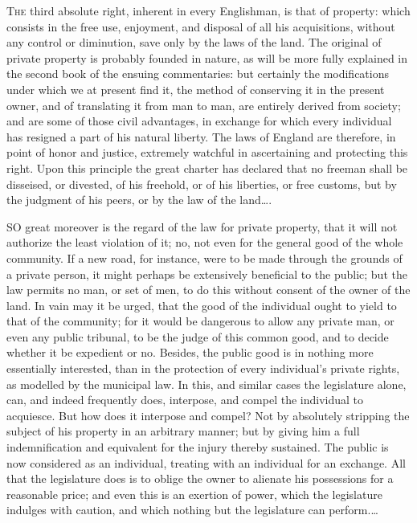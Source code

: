 
\textsc{The}
third absolute right, inherent in every Englishman, is that of property:
which consists in the free use, enjoyment, and disposal of all his
acquisitions, without any control or diminution, save only by the laws of the
land. The original of private property is probably founded in nature, as will
be more fully explained in the second book of the ensuing commentaries: but
certainly the modifications under which we at present find it, the method of
conserving it in the present owner, and of translating it from man to man, are
entirely derived from society; and are some of those civil advantages, in
exchange for which every individual has resigned a part of his natural liberty.
The laws of England are therefore, in point of honor and justice, extremely
watchful in ascertaining and protecting this right. Upon this principle the
great charter has declared that no freeman shall be disseised, or divested, of
his freehold, or of his liberties, or free customs, but by the judgment of his
peers, or by the law of the land\ldots.


SO great moreover is the regard of the law for private property, that it will
not authorize the least violation of it; no, not even for the general good of
the whole community. If a new road, for instance, were to be made through the
grounds of a private person, it might perhaps be extensively beneficial to the
public; but the law permits no man, or set of men, to do this without consent
of the owner of the land. In vain may it be urged, that the good of the
individual ought to yield to that of the community; for it would be dangerous
to allow any private man, or even any public tribunal, to be the judge of this
common good, and to decide whether it be expedient or no. Besides, the public
good is in nothing more essentially interested, than in the protection of every
individual's private rights, as modelled by the municipal law. In this, and
similar cases the legislature alone, can, and indeed frequently does,
interpose, and compel the individual to acquiesce. But how does it interpose
and compel? Not by absolutely stripping the subject of his property in an
arbitrary manner; but by giving him a full indemnification and equivalent for
the injury thereby sustained. The public is now considered as an individual,
treating with an individual for an exchange. All that the legislature does is
to oblige the owner to alienate his possessions for a reasonable price; and
even this is an exertion of power, which the legislature indulges with caution,
and which nothing but the legislature can perform.\ldots

